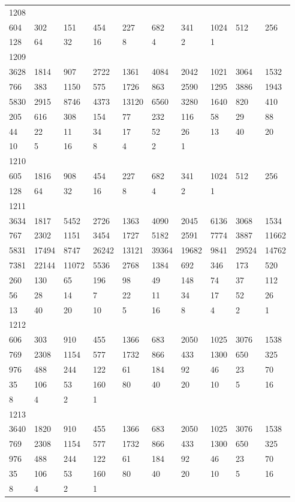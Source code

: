 \begin{longtable}{*{10}{l}}
1208&&&&&&&&&\\
604& 302& 151& 454& 227& 682& 341& 1024& 512& 256\\
128& 64& 32& 16& 8& 4& 2& 1& \\

1209&&&&&&&&&\\
3628& 1814& 907& 2722& 1361& 4084& 2042& 1021& 3064& 1532\\
766& 383& 1150& 575& 1726& 863& 2590& 1295& 3886& 1943\\
5830& 2915& 8746& 4373& 13120& 6560& 3280& 1640& 820& 410\\
205& 616& 308& 154& 77& 232& 116& 58& 29& 88\\
44& 22& 11& 34& 17& 52& 26& 13& 40& 20\\
10& 5& 16& 8& 4& 2& 1& \\

1210&&&&&&&&&\\
605& 1816& 908& 454& 227& 682& 341& 1024& 512& 256\\
128& 64& 32& 16& 8& 4& 2& 1& \\

1211&&&&&&&&&\\
3634& 1817& 5452& 2726& 1363& 4090& 2045& 6136& 3068& 1534\\
767& 2302& 1151& 3454& 1727& 5182& 2591& 7774& 3887& 11662\\
5831& 17494& 8747& 26242& 13121& 39364& 19682& 9841& 29524& 14762\\
7381& 22144& 11072& 5536& 2768& 1384& 692& 346& 173& 520\\
260& 130& 65& 196& 98& 49& 148& 74& 37& 112\\
56& 28& 14& 7& 22& 11& 34& 17& 52& 26\\
13& 40& 20& 10& 5& 16& 8& 4& 2& 1\\

1212&&&&&&&&&\\
606& 303& 910& 455& 1366& 683& 2050& 1025& 3076& 1538\\
769& 2308& 1154& 577& 1732& 866& 433& 1300& 650& 325\\
976& 488& 244& 122& 61& 184& 92& 46& 23& 70\\
35& 106& 53& 160& 80& 40& 20& 10& 5& 16\\
8& 4& 2& 1& \\

1213&&&&&&&&&\\
3640& 1820& 910& 455& 1366& 683& 2050& 1025& 3076& 1538\\
769& 2308& 1154& 577& 1732& 866& 433& 1300& 650& 325\\
976& 488& 244& 122& 61& 184& 92& 46& 23& 70\\
35& 106& 53& 160& 80& 40& 20& 10& 5& 16\\
8& 4& 2& 1& \\


\end{longtable}

